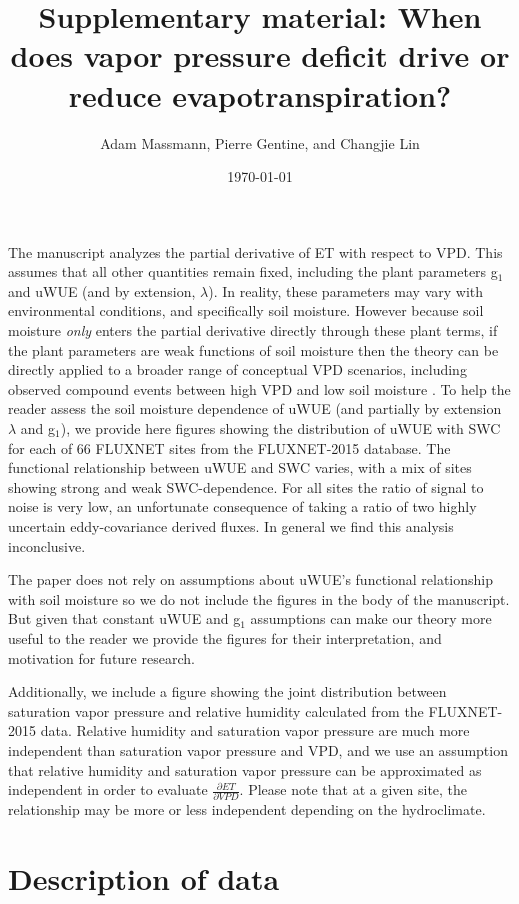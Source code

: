 \documentclass[12pt]{article}
\title{Supplementary material: When does vapor pressure deficit drive or
  reduce evapotranspiration?}
\author{Adam Massmann, Pierre Gentine, and Changjie Lin}
\date{\today}
\begin{document}
\maketitle

The manuscript analyzes the partial derivative of ET with respect to
VPD. This assumes that all other quantities remain fixed, including the
plant parameters g$_1$ and uWUE (and by extension, $\lambda$). In
reality, these parameters may vary with environmental conditions, and
specifically soil moisture. However because soil moisture
\textit{only} enters the partial derivative directly through these
plant terms, if the plant parameters are weak functions of soil
moisture then the theory can be directly applied to a broader range of
conceptual VPD scenarios, including observed compound events between
high VPD and low soil moisture \citep{Zhou_2019}. To help the reader
assess the soil moisture dependence of uWUE (and partially by
extension $\lambda$ and g$_1$), we provide here figures showing the
distribution of uWUE with SWC for each of 66 FLUXNET sites from the
FLUXNET-2015 database. The functional relationship between uWUE and
SWC varies, with a mix of sites showing strong and weak
SWC-dependence. For all sites the ratio of signal to noise is very
low, an unfortunate consequence of taking a ratio of two highly
uncertain eddy-covariance derived fluxes. In general we find this
analysis inconclusive.

The paper does not rely on assumptions about uWUE's functional
relationship with soil moisture so we do not include the figures in
the body of the manuscript. But given that constant uWUE and g$_1$
assumptions can make our theory more useful to the reader we provide
the figures for their interpretation, and motivation for future
research.

Additionally, we include a figure showing the joint distribution
between saturation vapor pressure and relative humidity calculated
from the FLUXNET-2015 data. Relative humidity and saturation vapor
pressure are much more independent than saturation vapor pressure and
VPD, and we use an assumption that relative humidity and saturation
vapor pressure can be approximated as independent in order to evaluate
$\frac{\partial ET}{\partial VPD}$. Please note that at a given site,
the relationship may be more or less independent depending on the
hydroclimate.

\section{Description of data}
\end{document}
